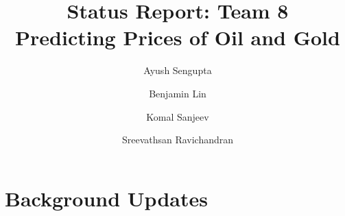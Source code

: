 \documentclass[runningheads]{llncs}
\newcommand{\keywords}[1]{\par\addvspace\baselineskip
\noindent\keywordname\enspace\ignorespaces#1}
\newcommand{\swallow}[1]{ }
\begin{document}
\mainmatter  %

\title{Status Report: Team 8\\
Predicting Prices of Oil and Gold}


%
%
\author{Ayush Sengupta \and Benjamin Lin \and Komal Sanjeev \and Sreevathsan Ravichandran}
%


%
%

\maketitle

\swallow{   %
\begin{abstract}
The abstract should summarize the contents of the paper and should
contain at least 70 and at most 150 words. It should be written using the
\emph{abstract} environment.
\keywords{We would like to encourage you to list your keywords within
the abstract section}
\end{abstract}
}

\section{Background Updates}
 
\end{document}
